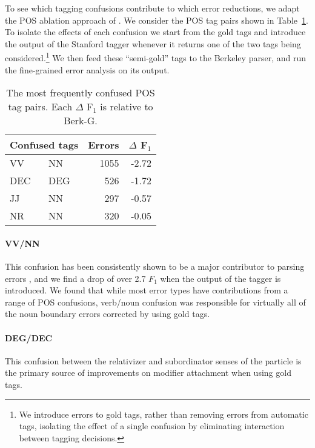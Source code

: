 To see which tagging confusions contribute to which error reductions, we adapt the POS
ablation approach of \textcite{Tse-Curran:2012:NAACL-HLT}.  We consider the POS
tag pairs shown in Table~\ref{tab:pos-confusion}.  To isolate the effects of
each confusion we start from the gold tags and introduce the output of the
Stanford tagger whenever it returns one of the two tags being
considered.\footnote{We introduce errors to gold tags, rather than removing
errors from automatic tags, isolating the effect of a single confusion
by eliminating interaction between tagging decisions.}
We then feed these ``semi-gold'' tags to the
Berkeley parser, and run the fine-grained error analysis on its output.

\begin{table}
  \centering
  \begin{tabular}{|llrr|}
    \hline
      \multicolumn{2}{c}{Confused tags} & Errors & $\Delta$ F$_1$ \\
    \hline
    \hline
      VV  & NN  & 1055 & -2.72 \\
      DEC & DEG &  526 & -1.72 \\
      JJ  & NN  &  297 & -0.57 \\
      NR  & NN  &  320 & -0.05 \\
    \hline
  \end{tabular}
  \caption[The most frequently confused POS tag pairs in Chinese parsing.]{ \label{tab:pos-confusion}
    The most frequently confused POS tag pairs.
    Each $\Delta$ F$_1$ is relative to Berk-G.
  }
\end{table}

\paragraph{VV/NN}  This confusion has been consistently shown to be a major
contributor to parsing errors
\parencite{Levy-Manning:2003:ACL,Tse-Curran:2012:NAACL-HLT,Qian-Liu:2012:EMNLP},
and we find a drop of over 2.7 $F_1$ when the output of the tagger is
introduced.  We found that while most error types have contributions from a
range of POS confusions, verb/noun confusion was responsible for virtually all of
the noun boundary errors corrected by using gold tags.

\paragraph{DEG/DEC}  This confusion between the relativizer and subordinator
senses of the particle  is the primary
source of improvements on modifier attachment when using gold tags.

